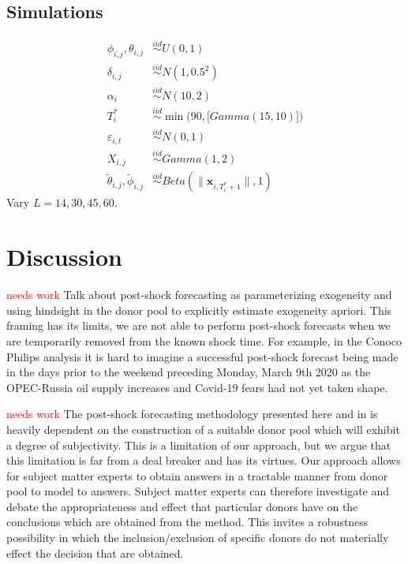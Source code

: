 \documentclass[11pt]{article}
\def\mbf#1{\mathbf{#1}} %
\newcommand{\simiid}{\stackrel{iid}{\sim}} %
\theoremstyle{definition}
\begin{document}
\subsection{Simulations}
\label{simulation}


\begin{align*}
	\phi_{i,j}, \theta_{i,j}  & \simiid U(0,1) \\ 
	\delta_{i,j} & \simiid N(1,0.5^2) \\
	\alpha_i & \simiid N(10, 2) \\
	T_i^* & \simiid \min\Big(90, \big[Gamma(15,10)\big]\Big) \\
	\varepsilon_{i,t} & \simiid N(0,1)\\
	X_{i,j} & \simiid Gamma(1,2) \\
	\tilde{\theta}_{i,j},\tilde{\phi}_{i,j} & \simiid Beta(\|\mbf{x}_{i,T_i^*+1}\|,1)
\end{align*}
Vary $L = 14, 30, 45,60$.



\section{Discussion}

\textcolor{red}{needs work} Talk about post-shock forecasting as parameterizing exogeneity and using hindsight in the donor pool to explicitly estimate exogeneity apriori. This framing has its limits, we are not able to perform post-shock forecasts when we are temporarily removed from the known shock time. For example, in the Conoco Philips analysis it is hard to imagine a successful post-shock forecast being made in the days prior to the weekend preceding Monday, March 9th 2020 as the OPEC-Russia oil supply increases and Covid-19 fears had not yet taken shape.

\textcolor{red}{needs work} The post-shock forecasting methodology presented here and in \cite{lin2021minimizing} is heavily dependent on the construction of a suitable donor pool which will exhibit a degree of subjectivity. This is a limitation of our approach, but we argue that this limitation is far from a deal breaker and has its virtues. Our approach allows for subject matter experts to obtain answers in a tractable manner from donor pool to model to answers. Subject matter experts can therefore investigate and debate the appropriateness and effect that particular donors have on the conclusions which are obtained from the method. This invites a robustness possibility in which the inclusion/exclusion of specific donors do not materially effect the decision that are obtained.
\end{document}
